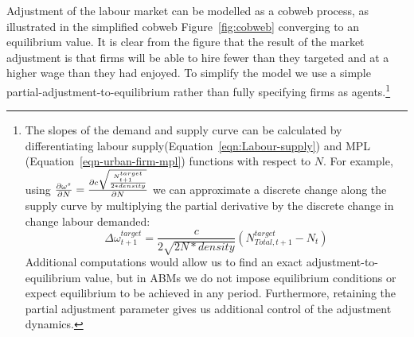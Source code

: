 Adjustment of the labour market can be modelled as a cobweb process, as illustrated in the simplified cobweb Figure~\ref{fig:cobweb} converging to an equilibrium value. It is clear from the figure that the result of the market adjustment is that firms will be able to hire fewer than they targeted and at a higher wage than they had enjoyed. To simplify the model we use a simple partial-adjustment-to-equilibrium  rather than fully specifying  firms as agents.\footnote{The  slopes of the demand and supply curve can be calculated by differentiating labour supply(Equation~\ref{eqn:Labour-supply}) and MPL (Equation~\ref{eqn-urban-firm-mpl}) functions with respect to $N$. For example, using  $\frac{\partial \omega^s}{\partial N}=\frac{\partial c\sqrt{\frac{N^{target}_{t+1}}{2 * density}}}{\partial N}$ we can approximate a discrete change along the supply curve  by multiplying the partial derivative by the discrete change in change labour demanded: 
\[ \Delta \omega_{t+1}^{target}= \frac{ c} {2\sqrt{2 N* density}}(N_{Total,t+1}^{target}-N_t)\]
Additional computations would allow us to find an exact adjustment-to-equilibrium value, but in ABMs we  do not impose equilibrium conditions or expect equilibrium to be achieved in any period. Furthermore, retaining the partial adjustment parameter gives us additional control of the adjustment dynamics.} 

